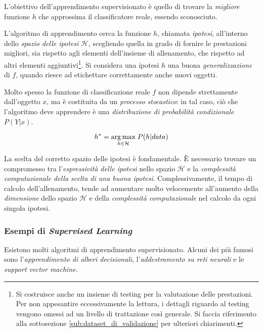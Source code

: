                 L'obiettivo dell'apprendimento supervisionato è quello di trovare la \emph{migliore} funzione $h$ che approssima il classificatore reale, essendo sconosciuto.

                L'algoritmo di apprendimento cerca la funzione $h$, chiamata \emph{ipotesi}, all'interno dello \emph{spazio delle ipotesi} $\mathcal{H}$, scegliendo quella in grado di fornire le prestazioni migliori, sia rispetto agli elementi dell'insieme di allenamento, che rispetto ad altri elementi aggiuntivi\footnote{Si costruisce anche un insieme di testing per la valutazione delle prestazioni. Per non appesantire eccessivamente la lettura, i dettagli riguardo al testing vengono omessi ad un livello di trattazione così generale. Si faccia riferimento alla sottosezione \ref{sub:dataset_di_validazione} per ulteriori chiarimenti.}.
                Si considera una ipotesi $h$ una buona \emph{generalizzazione} di $f$, quando riesce ad etichettare correttamente anche nuovi oggetti.

                Molto spesso la funzione di classificazione reale $f$ non dipende strettamente dall'oggetto $x$, ma è costituita da un \emph{processo stocastico}: in tal caso, ciò che l'algoritmo deve apprendere è una \emph{distribuzione di probabilità condizionale} $P(Y|x)$.

                \begin{equation}
                    \label{subeq:stochastic_hypotesis_choice}
                    h^* = \underset{h \in \mathcal{H}}{\operatorname{arg}\operatorname{max}}\;{P(h | data)}
                \end{equation}

                La scelta del corretto spazio delle ipotesi è fondamentale.
                È necessario trovare un compromesso tra l'\emph{espressività delle ipotesi} nello spazio $\mathcal{H}$ e la \emph{complessità computazionale della scelta di una buona ipotesi}.
                Complessivamente, il tempo di calcolo dell'allenamento, tende ad aumentare molto velocemente all'aumento della \emph{dimensione} dello spazio $\mathcal{H}$ e della \emph{complessità computazionale} nel calcolo da ogni singola ipotesi.  

            \subsubsection{Esempi di \emph{Supervised Learning}}
            \label{subsub:supervised_learning_examples}
                Esistono molti algoritmi di apprendimento supervisionato.
                Alcuni dei più famosi sono l'\emph{apprendimento di alberi decisionali}, l'\emph{addestramento su reti neurali} e le \emph{support vector machine}.

